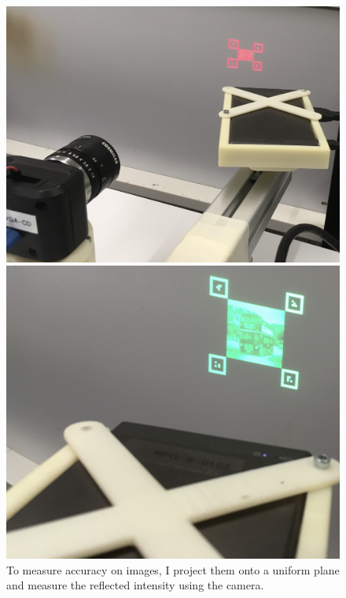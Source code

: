 \begin{figure}[hbt!]
    \centering
    \parbox{.45\textwidth}{
    \includegraphics[height = .7\linewidth]{resources/images/coco/setup.jpeg}
    }
    \parbox{.45\textwidth}{
    \includegraphics[height = .7\linewidth]{resources/images/coco/setup_close.jpeg}
    }
    \caption[Image Projection Setup]{To measure accuracy on images, I project them onto a uniform plane and measure the reflected intensity using the camera.}
    \label{fig:COCOSetup}
\end{figure}